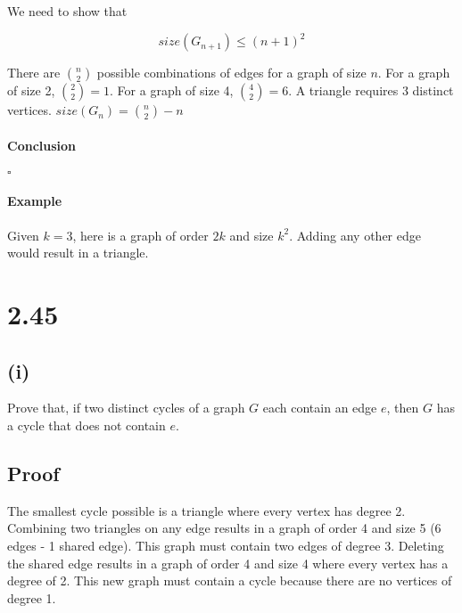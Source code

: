 \documentclass[11pt]{article}
\begin{document}
We need to show that

$$size(G_{n+1}) \le (n+1)^2$$

There are ${n \choose 2}$ possible combinations of edges for a graph of size $n$.
For a graph of size 2, ${2 \choose 2} = 1$.
For a graph of size 4, ${4 \choose 2} = 6$.
A triangle requires 3 distinct vertices.
$size(G_n) = {n \choose 2} - n$


\paragraph{Conclusion}

$\square$

\paragraph{Example}

Given $k=3$, here is a graph of order $2k$ and size $k^2$.
Adding any other edge would result in a triangle.


\section*{2.45}

\subsection*{(i)}
Prove that, if two distinct cycles of a graph $G$ each contain an edge $e$, then $G$ has a cycle that does not contain $e$.

\subsection*{Proof}

The smallest cycle possible is a triangle where every vertex has degree 2.
Combining two triangles on any edge results in a graph of order 4 and size 5 (6 edges - 1 shared edge).
This graph must contain two edges of degree 3.
Deleting the shared edge results in a graph of order 4 and size 4 where every vertex has a degree of 2.
This new graph must contain a cycle because there are no vertices of degree 1.
\end{document}
